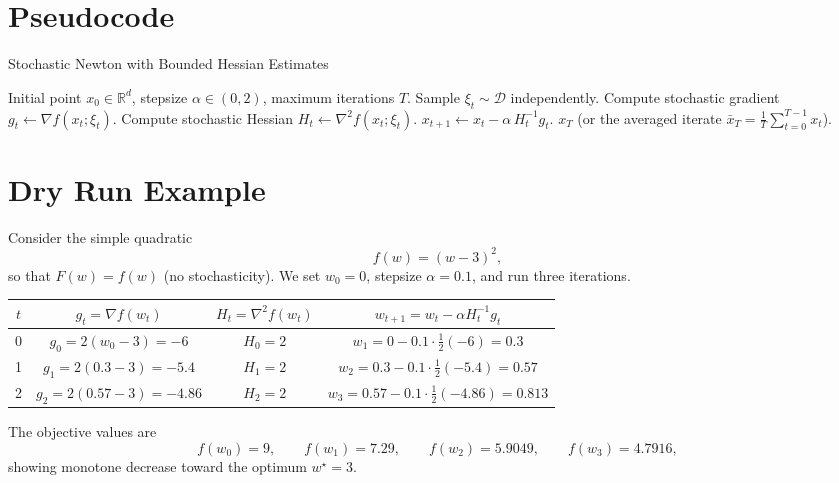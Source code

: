 \documentclass{article}
\begin{document}
\section*{Pseudocode}
\begin{algorithm}[H]
\caption{Stochastic Newton with Bounded Hessian Estimates}
\label{alg:sn-bh}
\begin{algorithmic}[1]
\Require Initial point $x_0\in\mathbb{R}^d$, stepsize $\alpha\in(0,2)$, maximum iterations $T$.
    \State Sample $\xi_t\sim\mathcal{D}$ independently.
    \State Compute stochastic gradient $g_t \gets \nabla f(x_t;\xi_t)$.
    \State Compute stochastic Hessian $H_t \gets \nabla^2 f(x_t;\xi_t)$.
    \State $x_{t+1} \gets x_t - \alpha\, H_t^{-1} g_t$.
\EndFor
\State \Return $x_T$ (or the averaged iterate $\bar{x}_T=\frac1T\sum_{t=0}^{T-1}x_t$).
\end{algorithmic}
\end{algorithm}

\section*{Dry Run Example}
Consider the simple quadratic
\[
    f(w)= (w-3)^2,
\]
so that $F(w)=f(w)$ (no stochasticity).  
We set $w_0=0$, stepsize $\alpha=0.1$, and run three iterations.

\begin{center}
\begin{tabular}{c|c|c|c}
$t$ & $g_t=\nabla f(w_t)$ & $H_t=\nabla^2 f(w_t)$ & $w_{t+1}=w_t-\alpha H_t^{-1}g_t$\\\midrule
0 & $g_0 = 2(w_0-3) = -6$ & $H_0 = 2$ & $w_1 = 0-0.1\cdot\frac{1}{2}(-6)=0.3$\\
1 & $g_1 = 2(0.3-3) = -5.4$ & $H_1 = 2$ & $w_2 = 0.3-0.1\cdot\frac{1}{2}(-5.4)=0.57$\\
2 & $g_2 = 2(0.57-3) = -4.86$ & $H_2 = 2$ & $w_3 = 0.57-0.1\cdot\frac{1}{2}(-4.86)=0.813$\\
\end{tabular}
\end{center}

The objective values are
\[
    f(w_0)=9,\qquad f(w_1)=7.29,\qquad f(w_2)=5.9049,\qquad f(w_3)=4.7916,
\]
showing monotone decrease toward the optimum $w^\star=3$.

\end{document}
